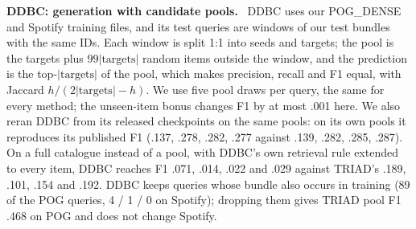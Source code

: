 \documentclass[runningheads]{llncs}
\renewcommand{\paragraph}[1]{\smallskip\noindent\textbf{#1}\ }
\begin{document}
\paragraph{DDBC: generation with candidate pools.} DDBC uses our POG\_DENSE and Spotify training files, and its test
queries are windows of our test bundles with the same IDs. Each window is split 1:1 into seeds and targets; the pool
is the targets plus $99|\text{targets}|$ random items outside the window, and the prediction is the top-$|\text{targets}|$
of the pool, which makes precision, recall and F1 equal, with Jaccard $h/(2|\text{targets}|-h)$. We use five pool
draws per query, the same for every method; the unseen-item bonus changes F1 by at most .001 here. We also reran DDBC from its released checkpoints on the same pools:
on its own pools it reproduces its published F1 (.137, .278, .282, .277 against .139, .282, .285, .287). On a full
catalogue instead of a pool, with DDBC's own retrieval rule extended to every item, DDBC reaches F1 .071, .014, .022
and .029 against TRIAD's .189, .101, .154 and .192. DDBC keeps queries whose bundle also occurs in training (89 of the
POG queries, 4 / 1 / 0 on Spotify); dropping them gives TRIAD pool F1 .468 on POG and does not change Spotify.
\end{document}

